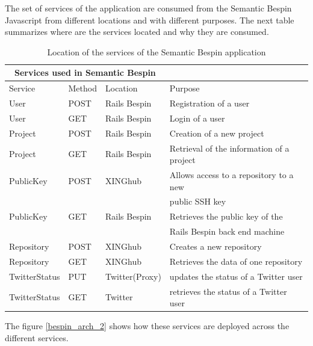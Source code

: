 The set of services of the application are consumed from the Semantic Bespin Javascript from different locations and
with different purposes. The next table summarizes where are the services located and why they are consumed.

 \begin{table}
\begin{tabular}{|l|l|l|l|}
  \hline
  \multicolumn{3}{|c|}{Services used in Semantic Bespin} \\
  \hline
  Service & Method & Location & Purpose \\
  \hline
  User& POST & Rails Bespin&  Registration of a user\\
  User& GET & Rails Bespin & Login of a user\\
  Project& POST & Rails Bespin & Creation of a new project\\
  Project& GET & Rails Bespin & Retrieval of the information of a project\\
  PublicKey& POST & XINGhub & Allows access to a repository to a new\\
                 &        &                                    & public SSH key\\
  PublicKey& GET & Rails Bespin & Retrieves the public key of the \\
                 &        &                                    & Rails Bespin back end machine \\
  Repository& POST & XINGhub &Creates a new repository\\
  Repository& GET & XINGhub & Retrieves the data of one repository\\
  TwitterStatus& PUT & Twitter(Proxy) & updates the status of a Twitter user\\
  TwitterStatus& GET & Twitter & retrieves the status of a Twitter user\\
  \hline
\end{tabular}
\caption{Location of the services of the Semantic Bespin application}
\end{table}

The figure \ref{bespin_arch_2}  shows how these services are deployed across the different services.

